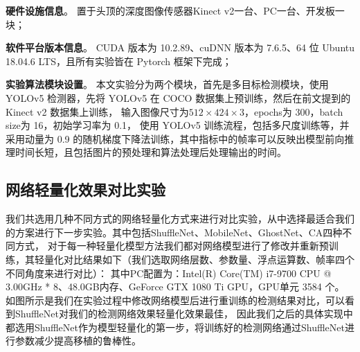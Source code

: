 \textbf{硬件设施信息}。
置于头顶的深度图像传感器Kinect v2一台、PC一台、开发板一块；

\textbf{软件平台版本信息}。
CUDA 版本为 10.2.89、cuDNN 版本为 7.6.5、64 位 Ubuntu 18.04.6 LTS，且所有实验皆在 Pytorch 框架下完成；

\textbf{实验算法模块设置}。
本文实验分为两个模块，首先是多目标检测模块，使用 YOLOv5 检测器，先将 YOLOv5 在 COCO 数据集上预训练，然后在前文提到的 Kinect v2 数据集上训练，
输入图像尺寸为$512\times 424 \times 3$，epochs为 300，batch size为 16，初始学习率为 0.1，
使用 YOLOv5 训练流程，包括多尺度训练等，并采用动量为 0.9 的随机梯度下降法训练，其中指标中的帧率可以反映出模型前向推理时间长短，且包括图片的预处理和算法处理后处理输出的时间。

\subsection{网络轻量化效果对比实验}
\label{sec4-4-2}
我们共选用几种不同方式的网络轻量化方式来进行对比实验，从中选择最适合我们的方案进行下一步实验。其中包括ShuffleNet、MobileNet、GhostNet、CA四种不同方式，
对于每一种轻量化模型方法我们都对网络模型进行了修改并重新预训练，其轻量化对比结果如下（我们选取网络层数、参数量、浮点运算数、帧率四个不同角度来进行对比）：
其中PC配置为：Intel(R) Core(TM) i7-9700 CPU @ 3.00GHz * 8、48.0GB内存、GeForce GTX 1080 Ti GPU，GPU单元 3584 个。
如图所示是我们在实验过程中修改网络模型后进行重训练的检测结果对比，可以看到ShuffleNet对我们的检测网络效果轻量化效果最佳，
因此我们之后的具体实现中都选用ShuffleNet作为模型轻量化的第一步，将训练好的检测网络通过ShuffleNet进行参数减少提高移植的鲁棒性。

